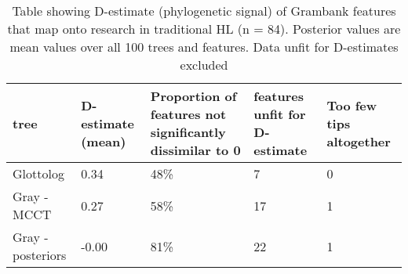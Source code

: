 \begin{table}[ht]
\centering
\begin{tabular}{p{3cm}p{2.2cm}p{4cm}p{3cm}p{2cm}}
  \hline
tree & D-estimate (mean) & Proportion of features not significantly dissimilar to 0 & features unfit for D-estimate & Too few tips altogether \\ 
  \hline
Glottolog & 0.34 & 48\% & 7 & 0 \\ 
  Gray - MCCT & 0.27 & 58\% & 17 & 1 \\ 
  Gray - posteriors & -0.00 & 81\% & 22 & 1 \\ 
   \hline
\end{tabular}
\caption{Table showing D-estimate (phylogenetic signal) of Grambank features that map onto research in traditional HL (n = 84). Posterior values are mean values over all 100 trees and features. Data unfit for D-estimates excluded} 
\label{d_estimate_summary}
\end{table}
